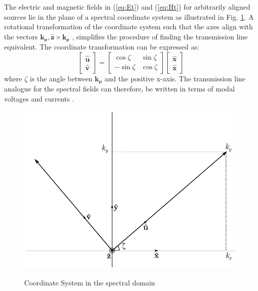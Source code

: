 \documentclass[11pt]{article}
\renewcommand{\v}[1]{\mathbf{#1}} %
\newcommand{\p}{\rho}  %
\newcommand{\x}{\times}  %
\renewcommand{\^}{\hat}  %
\begin{document}
  The electric and magnetic fields in (\ref{eq:Et}) and (\ref{eq:Ht}) for arbitrarily aligned sources lie in the plane of a spectral coordinate system as illustrated in Fig. \ref{fig:SpCS}. A rotational transformation of the coordinate system such that the axes align with the vectors $\v{k_{\p}}, \v{\^z} \x \v{k_{\p}}$ \cite{itoh1980spectral}, simplifies the procedure of finding the transmission line equivalent. The coordinate transformation can be expressed as:
  \begin{equation}
    \left[\begin{array}{c}
    \v{\^u} \\
    \v{\^v}
    \end{array} \right]
    = \left[ \begin{array}{cc}
    \cos \zeta & \sin \zeta \\
    -\sin \zeta & \cos \zeta
    \end{array} \right]
    \left[\begin{array}{c}
    \v{\^x} \\
    \v{\^x}
    \end{array} \right]
    \label{eq:xtion}
  \end{equation}
  where $\zeta$ is the angle between $\v{k_{\p}}$ and the positive x-axis. The transmission line analogue for the spectral fields can therefore, be written in terms of modal voltages and currents \cite{kastner1988spectral, michalski1997multilayered}.

  \begin{figure}[t!]
    \centering
    {\includegraphics[scale=.75]{fig_coordinate.pdf}}
    \caption{Coordinate System in the spectral domain \cite[p. 1166]{michalski2005electromagnetic}}
    \label{fig:SpCS}
  \end{figure}
\end{document}
